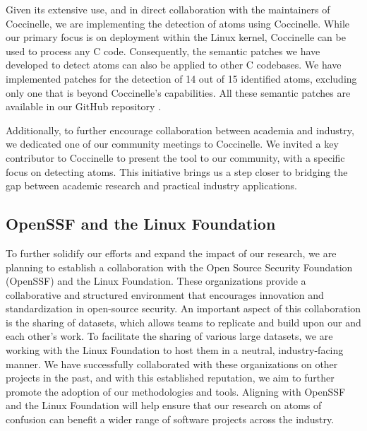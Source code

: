 \documentclass[conference]{IEEEtran}
\begin{document}
Given its extensive use, and in direct collaboration with the 
maintainers of Coccinelle, we are implementing the detection 
of atoms using Coccinelle. While our primary focus is on 
deployment within the Linux kernel, Coccinelle can be used to 
process any C code. Consequently, the semantic patches we have 
developed to detect atoms can also be applied to other C 
codebases. We have implemented patches for the detection of 14 
out of 15 identified atoms, excluding only one that is beyond 
Coccinelle's capabilities. All these semantic patches are available in our GitHub repository \cite{githubcocci}. 

Additionally, to further encourage collaboration between 
academia and industry, we dedicated one of our community 
meetings to Coccinelle. We invited a key contributor to 
Coccinelle to present the tool to our community, with a 
specific focus on detecting atoms. This initiative brings us a 
step closer to bridging the gap between academic research and 
practical industry applications.

\subsection{OpenSSF and the Linux Foundation}

To further solidify our efforts and expand the impact of our 
research, we are planning to establish a collaboration with 
the Open Source Security Foundation (OpenSSF) and the Linux 
Foundation. These organizations provide a collaborative and 
structured environment that encourages innovation and 
standardization in open-source security. An important aspect 
of this collaboration is the sharing of datasets, which allows 
teams to replicate and build upon our and each other's work. 
To facilitate the sharing of various large datasets, we are 
working with the Linux Foundation to host them in a neutral, 
industry-facing manner. We have successfully collaborated with 
these organizations on other projects in the past, and with 
this established reputation, we aim to further promote the 
adoption of our methodologies and tools. Aligning with OpenSSF 
and the Linux Foundation will help ensure that our research on 
atoms of confusion can benefit a wider range of software 
projects across the industry.

{\scriptsize  }
\end{document}
